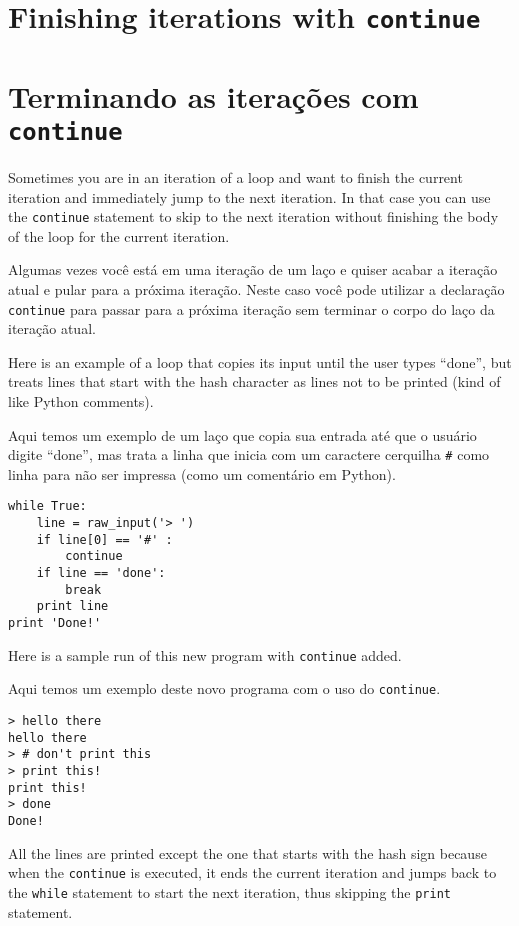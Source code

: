 \section{Finishing iterations with {\tt continue}}

\section{Terminando as iterações com {\tt continue}}

Sometimes you are in an iteration of a loop and want to finish the
current iteration and immediately jump to the next iteration.
In that case you can use the {\tt continue}
statement to skip to the next iteration without finishing the
body of the loop for the current iteration.

Algumas vezes você está em uma iteração de um laço e quiser acabar a iteração
atual e pular para a próxima iteração. Neste caso você pode utilizar a
declaração {\tt continue} para passar para a próxima iteração sem terminar o
corpo do laço da iteração atual.

Here is an example of a loop that copies its input until the user
types ``done'', but treats lines that start with the hash character
as lines not to be printed (kind of like Python comments).

Aqui temos um exemplo de um laço que copia sua entrada até que o usuário
digite ``done'', mas trata a linha que inicia com um caractere cerquilha
{\tt #} como linha para não ser impressa (como um comentário em Python).

\beforeverb
\begin{verbatim}
while True:
    line = raw_input('> ')
    if line[0] == '#' :
        continue
    if line == 'done':
        break
    print line
print 'Done!'
\end{verbatim}
\afterverb
%
Here is a sample run of this new program with {\tt continue} added.

%
Aqui temos um exemplo deste novo programa com o uso do {\tt continue}.

\beforeverb
\begin{verbatim}
> hello there
hello there
> # don't print this
> print this!
print this!
> done
Done!
\end{verbatim}
\afterverb
%
All the lines are printed except the one that starts with the hash
sign because when the {\tt continue} is executed, it ends 
the current iteration and jumps
back to the {\tt while} statement to start the next iteration, thus 
skipping the {\tt print} statement.

